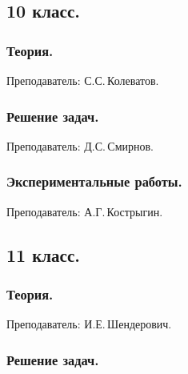 \documentclass[12pt,a4paper,oneside]{scrartcl}
\newcounter{notask}
\newlength{\h}
\newlength{\x}
\begin{document}
\subsection{10 класс.}
\label{sec:daily_10}

\subsubsection{Теория.}
\label{sec:daily_10_th}

\textsf{Преподаватель: С.С.\,Колеватов.}
\smallskip



\subsubsection{Решение задач.}
\label{sec:daily_10_problems}

\textsf{Преподаватель: Д.С.\,Смирнов.}
\smallskip









\setcounter{notask}{1}
\parindent=5mm

\subsubsection{Экспериментальные работы.}
\label{sec:daily_10_exp}

\textsf{Преподаватель: А.Г.\,Кострыгин.}



\subsection{11 класс.}
\label{sec:daily_11}

\subsubsection{Теория.}
\label{sec:daily_11_th}

\textsf{Преподаватель: И.Е.\,Шендерович.}
\smallskip



\subsubsection{Решение задач.}
\label{sec:daily_11_problems}
\end{document}
